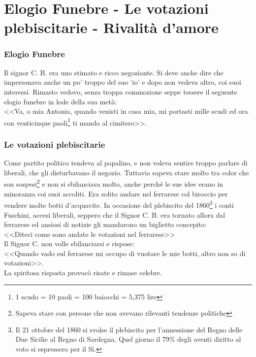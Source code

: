 
\chapter{Elogio Funebre - Le votazioni plebiscitarie - Rivalità d'amore}
\subsection{Elogio Funebre}
Il signor C. B. era uno stimato e ricco negoziante. Si deve anche dire che impersonava anche un po' troppo del suo `io' e dopo non vedeva altro, coi suoi interessi. Rimasto vedovo, senza troppa commozione seppe tessere il seguente elogio funebre in lode della sua metà:\\
\indent <<Va, o mia Antonia, quando venisti in casa mia, mi portasti mille scudi ed ora con venticinque paoli\footnote{1 scudo = 10 paoli = 100 baiocchi = 5,375 lire} ti mando al cimitero>>.\\

\subsection{Le votazioni plebiscitarie}
Come partito politico tendeva al papalino, e non voleva sentire troppo parlare di liberali, che gli disturbavano il negozio. Tuttavia sapeva stare molto tra color che son sospesi\footnote{Sapeva stare con persone che non avevano rilevanti tendenze politiche} e non si sbilanciava molto, anche perché le sue idee erano in minoranza coi suoi accoliti. Era solito andare nel ferrarese col biroccio per vendere molte botti d'acquavite. In occasione del plebiscito del 1860\footnote{Il 21 ottobre del 1860 si svolse il plebiscito per l'annessione del Regno delle Due Sicilie al Regno di Sardegna. Quel giorno il 79\% degli aventi diritto al voto si espressero per il Sì.} i conti Fuschini, accesi liberali, seppero che il Signor C. B. era tornato allora dal ferrarese ed ansiosi di notizie gli mandarono un biglietto concepito:\\
\indent <<Diteci come sono andate le votazioni nel ferrarese>>\\
\indent Il Signor C. non volle sbilanciarsi e rispose:\\
\indent<<Quando vado sul ferrarese mi occupo di vuotare le mie botti, altro non so di votazioni>>.\\
\indent La spiritosa risposta provocò risate e rimase celebre. \\
